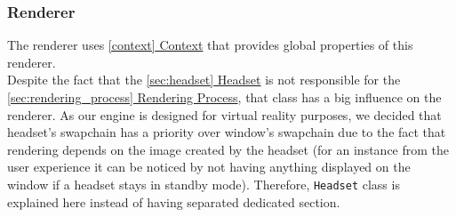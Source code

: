 \subsubsection{Renderer}
\label{sec:renderer}
\hspace{\parindent} The renderer uses \hyperref[context]{\ref*{context} Context} that provides global properties of this renderer.\\
Despite the fact that the \hyperref[sec:headset]{\ref*{sec:headset} Headset} is not responsible for the \hyperref[sec:rendering_process]{\ref*{sec:rendering_process} Rendering Process}, that class has a big influence on the renderer. As our engine is designed for virtual reality purposes, we decided that headset's swapchain has a priority over window's swapchain due to the fact that rendering depends on the image created by the headset (for an instance from the user experience it can be noticed by not having anything displayed on the window if a headset stays in standby mode). Therefore, \texttt{Headset} class is explained here instead of having separated dedicated section.

